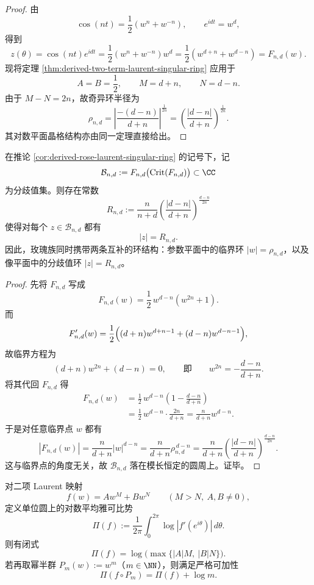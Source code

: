 \begin{proof}
由
\[
\cos(nt)=\frac12(w^n+w^{-n}),
\qquad
e^{idt}=w^d,
\]
得到
\[
z(\theta)=\cos(nt)e^{idt}
=
\frac12(w^n+w^{-n})w^d
=
\frac12(w^{d+n}+w^{d-n})
=
F_{n,d}(w).
\]
现将定理 \ref{thm:derived-two-term-laurent-singular-ring} 应用于
\[
A=B=\frac12,
\qquad
M=d+n,
\qquad
N=d-n.
\]
由于 \(M-N=2n\)，故奇异环半径为
\[
\rho_{n,d}
=
\left|
\frac{-(d-n)}{d+n}
\right|^{\frac1{2n}}
=
\left(\frac{|d-n|}{d+n}\right)^{\frac1{2n}}.
\]
其对数平面晶格结构亦由同一定理直接给出。
\end{proof}

\begin{theorem}[玫瑰映射的像平面分歧值环]\label{thm:derived-rose-image-branch-ring}
在推论 \ref{cor:derived-rose-laurent-singular-ring} 的记号下，记
\[
\mathcal B_{n,d}:=
F_{n,d}\bigl(\operatorname{Crit}(F_{n,d})\bigr)\subset\CC
\]
为分歧值集。则存在常数
\[
R_{n,d}
:=
\frac{n}{n+d}
\left(
\frac{|d-n|}{d+n}
\right)^{\frac{d-n}{2n}}
\]
使得对每个 \(z\in \mathcal B_{n,d}\) 都有
\[
|z|=R_{n,d}.
\]
因此，玫瑰族同时携带两条互补的环结构：参数平面中的临界环 \(|w|=\rho_{n,d}\)，以及像平面中的分歧值环 \(|z|=R_{n,d}\)。
\end{theorem}

\begin{proof}
先将 \(F_{n,d}\) 写成
\[
F_{n,d}(w)=\frac12\,w^{d-n}(w^{2n}+1).
\]
而
\[
F_{n,d}'(w)
=
\frac12\Bigl((d+n)w^{d+n-1}+(d-n)w^{d-n-1}\Bigr),
\]
故临界方程为
\[
(d+n)w^{2n}+(d-n)=0,
\qquad\text{即}\qquad
w^{2n}=-\frac{d-n}{d+n}.
\]
将其代回 \(F_{n,d}\) 得
\[
\begin{aligned}
F_{n,d}(w)
&=
\frac12\,w^{d-n}\left(1-\frac{d-n}{d+n}\right) \\
&=
\frac12\,w^{d-n}\cdot \frac{2n}{d+n}
=
\frac{n}{d+n}w^{d-n}.
\end{aligned}
\]
于是对任意临界点 \(w\) 都有
\[
|F_{n,d}(w)|
=
\frac{n}{d+n}|w|^{d-n}
=
\frac{n}{d+n}\rho_{n,d}^{\,d-n}
=
\frac{n}{d+n}
\left(
\frac{|d-n|}{d+n}
\right)^{\frac{d-n}{2n}}.
\]
这与临界点的角度无关，故 \(\mathcal B_{n,d}\) 落在模长恒定的圆周上。证毕。
\end{proof}

\begin{theorem}\label{thm:derived-laurent-haar-jensen-potential}
对二项 Laurent 映射
\[
f(w)=Aw^M+Bw^N
\qquad (M>N,\ A,B\neq 0),
\]
定义单位圆上的对数平均雅可比势
\[
\Pi(f):=\frac{1}{2\pi}\int_{0}^{2\pi}\log|f'(e^{i\theta})|\,d\theta.
\]
则有闭式
\[
\Pi(f)=\log\bigl(\max\{|A|M,\ |B|N\}\bigr).
\]
若再取幂半群 \(P_m(w):=w^m\)（\(m\in\NN\)），则满足严格可加性
\[
\Pi(f\circ P_m)=\Pi(f)+\log m.
\]
\end{theorem}

